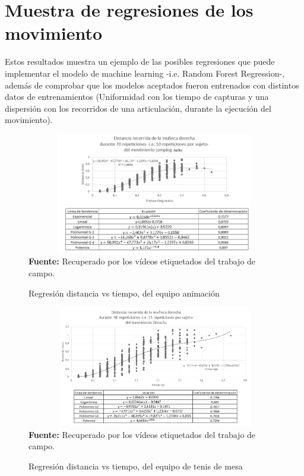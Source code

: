 \section{Muestra de regresiones de los movimiento} \label{res:regretions}
Estos resultados muestra un ejemplo de las posibles regresiones que puede implementar el modelo de machine learning -i.e. Random Forest Regression-, adem\'as de comprobar que los modelos aceptados fueron entrenados con distintos datos de entrenamientos (Uniformidad con los tiempo de capturas y una dispersi\'on con los recorridos de una articulaci\'on, durante la ejecuci\'on del  movimiento).
\begin{figure}[H]
	\caption{Regresi\'on distancia vs tiempo, del equipo animaci\'on}
	\label{fig:regrCheerleader}
	\centering
	\includegraphics[width=445px,height=200px]{graphics/resultados/cluster-cheerleaders.PNG} \\
	\textbf{Fuente:} Recuperado por los v\'ideos etiquetados del trabajo de campo.
\end{figure}
\begin{figure}[H]
	\caption{Regresi\'on distancia vs tiempo, del equipo de tenis de mesa}
	\label{fig:regrTennisDeMesa}
	\centering
	\includegraphics[width=445px,height=200px]{graphics/resultados/cluster-tennis.PNG} \\
	\textbf{Fuente:} Recuperado por los v\'ideos etiquetados del trabajo de campo.
\end{figure}
